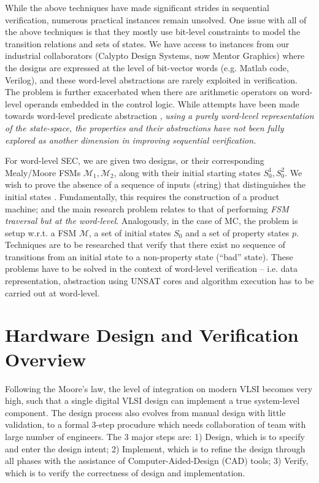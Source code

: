 While the above techniques have made significant strides in sequential
verification, numerous practical instances remain unsolved. One issue
with all of the above techniques is that they mostly use bit-level
constraints to model the transition relations and sets of 
states. We have access to instances from our industrial
collaborators (Calypto Design Systems, now Mentor Graphics) where
the designs are expressed at the level of bit-vector words
(e.g. Matlab code, Verilog), and these word-level abstractions are
rarely exploited in verification. The problem is further exacerbated
when there are arithmetic operators on word-level operands embedded in
the control logic. While attempts have been made towards word-level
predicate abstraction \cite{Jain05wordlevel} \cite{mcmillan:cav06}
\cite{mcmillan:impact}, {\it using a purely word-level representation
  of the state-space, the properties and their abstractions have not
  been fully explored as another dimension in improving sequential
  verification.}  


For word-level SEC, we are given two designs, or their corresponding
Mealy/Moore FSMs ${\mathcal{M}}_1,{\mathcal{M}}_2$, along with their
initial starting states $S_0^1,S_0^2$. We wish to prove the absence of
a sequence of inputs (string) that distinguishes the initial
states \cite{coudert:iccad90}
\cite{coudert1990verification}. Fundamentally, this requires 
the construction of a product machine; and the main research problem
relates to that of performing {\it FSM traversal \cite{touati:iccad90}
but  at the word-level}. Analogously, in the case of MC, the problem
is setup w.r.t. a FSM $\mathcal{M}$, a set of initial states $S_0$ and
a set of property states $p$. Techniques are to be researched that
verify that there exist no sequence of transitions from an initial
state to a non-property state (``bad'' state). These problems have to
be solved in the context of word-level verification -- i.e. data
representation, abstraction using UNSAT cores and
algorithm execution has to be carried out at word-level.   




\section{Hardware Design and Verification Overview}
Following the Moore's law, the level of integration on modern VLSI becomes very high, 
such that a single digital VLSI design can implement a true system-level component.
The design process also evolves from manual design with little validation, to 
a formal 3-step procudure which needs collaboration of team with large number of 
engineers. The 3 major steps are: 1) Design, which is to specify and enter the design intent;
2) Implement, which is to refine the design through all phases with the assistance of Computer-Aided-Design (CAD)
tools; 3) Verify, which is to verify the correctness of design and implementation.

